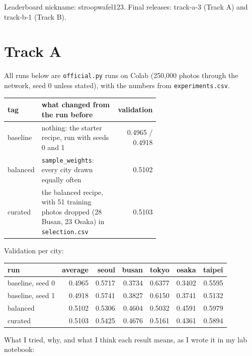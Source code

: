 \documentclass[11pt]{article}
\begin{document}
\makeheader

Leaderboard nickname: stroopwafel123. Final releases: track-a-3 (Track A) and
track-b-1 (Track B).

\section*{Track A}

All runs below are \texttt{official.py} runs on Colab (250,000 photos through
the network, seed 0 unless stated), with the numbers from
\texttt{experiments.csv}.

\begin{center}\footnotesize
\begin{tabular}{lp{0.6\linewidth}r}
\toprule
tag & what changed from the run before & validation \\
\midrule
baseline & nothing: the starter recipe, run with seeds 0 and 1 & 0.4965 / 0.4918 \\
balanced & \texttt{sample\_weights}: every city drawn equally often & 0.5102 \\
curated  & the balanced recipe, with 51 training photos dropped (28 Busan, 23 Osaka) in \texttt{selection.csv} & 0.5103 \\
\bottomrule
\end{tabular}
\end{center}

Validation per city:

\begin{center}\footnotesize
\begin{tabular}{lrrrrrr}
\toprule
run & average & seoul & busan & tokyo & osaka & taipei \\
\midrule
baseline, seed 0 & 0.4965 & 0.5717 & 0.3734 & 0.6377 & 0.3402 & 0.5595 \\
baseline, seed 1 & 0.4918 & 0.5741 & 0.3827 & 0.6150 & 0.3741 & 0.5132 \\
balanced         & 0.5102 & 0.5306 & 0.4604 & 0.5032 & 0.4591 & 0.5979 \\
curated          & 0.5103 & 0.5425 & 0.4676 & 0.5161 & 0.4361 & 0.5894 \\
\bottomrule
\end{tabular}
\end{center}

What I tried, why, and what I think each result means, as I wrote it in my
lab notebook:

\end{document}
